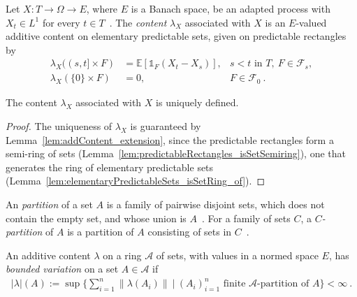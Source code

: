 \begin{definition}\label{def:contentAssociatedWithProcess}
Let $X : T \to \Omega \to E$, where $E$ is a Banach space,
 be an adapted process with $X_t \in L^1$ for every $t \in T$~.
The \emph{content} $\lambda_X$ associated with $X$
is an $E$-valued additive content on
elementary predictable sets,
given on predictable rectangles by
\begin{align*}
  \lambda_X((s, t] \times F) &= \mathbb{E}[\mathbb{1}_F (X_t - X_s)],
  & s < t \text{ in } T,\ F \in \mathcal{F}_s,
  \\
  \lambda_X(\{0\} \times F) &= 0,
  & F \in \mathcal{F}_0
  \: .
\end{align*}
\end{definition}

\begin{lemma}\label{lem:contentAssociatedWithProcess_wellDefined}
  The content $\lambda_X$ associated with $X$ is uniquely defined.
\end{lemma}

\begin{proof}
The uniqueness of $\lambda_X$ is guaranteed by Lemma~\ref{lem:addContent_extension},
since the predictable rectangles form a semi-ring of sets
(Lemma~\ref{lem:predictableRectangles_isSetSemiring}),
one that generates the ring of elementary predictable sets
(Lemma~\ref{lem:elementaryPredictableSets_isSetRing_of}).
\end{proof}

\begin{definition}\label{def:partitionOfSet}
  \mathlibok
  An \emph{partition} of a set $A$ is a family of pairwise disjoint sets,
  which does not contain the empty set, and whose union is $A$~.
  For a family of sets $C$, a \emph{$C$-partition} of $A$ is a partition of $A$ consisting of sets in $C$~.
\end{definition}

\begin{definition}\label{def:contentBoundedVariation}
An additive content $\lambda$ on a ring $\mathcal{A}$ of sets, with values in a normed space $E$,
has \emph{bounded variation} on a set $A \in \mathcal{A}$ if
\begin{align*}
  \vert \lambda \vert(A)
  := \sup
  \Big\{
    \sum_{i=1}^n \| \lambda(A_i) \|
    \:\Big|\:
    (A_i)_{i=1}^n \text{ finite } \mathcal{A}\text{-partition of } A
  \Big\}
  < \infty
  \: .
\end{align*}
\end{definition}

